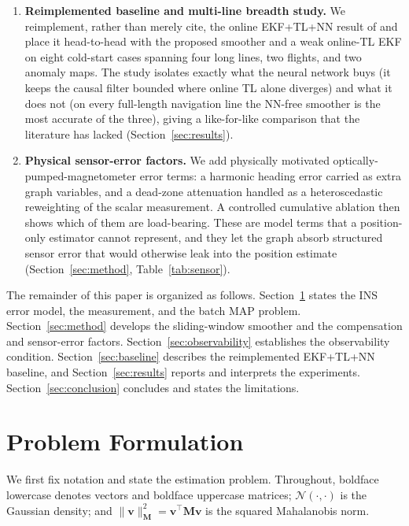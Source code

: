 \documentclass{IEEEtaes}
\begin{document}
\begin{enumerate}
        cannot see (Section~\ref{sec:observability}).
  \item \textbf{Reimplemented baseline and multi-line breadth study.} We
        reimplement, rather than merely cite, the online EKF+TL+NN result of
        \cite{hager2026} and place it head-to-head with the proposed smoother and a
        weak online-TL EKF on eight cold-start cases spanning four long lines, two
        flights, and two anomaly maps. The study isolates exactly what the neural
        network buys (it keeps the causal filter bounded where online TL alone
        diverges) and what it does not (on every full-length navigation line the
        NN-free smoother is the most accurate of the three), giving a like-for-like
        comparison that the literature has lacked (Section~\ref{sec:results}).
  \item \textbf{Physical sensor-error factors.} We add physically motivated
        optically-pumped-magnetometer error terms: a harmonic heading error carried
        as extra graph variables, and a dead-zone attenuation handled as a
        heteroscedastic reweighting of the scalar measurement. A controlled
        cumulative ablation then shows which of them are load-bearing. These are
        model terms that a position-only estimator cannot represent, and they let
        the graph absorb structured sensor error that would otherwise leak into the
        position estimate (Section~\ref{sec:method}, Table~\ref{tab:sensor}).
\end{enumerate}

The remainder of this paper is organized as follows.
Section~\ref{sec:background} states the INS error model, the measurement, and the
batch MAP problem. Section~\ref{sec:method} develops the sliding-window smoother
and the compensation and sensor-error factors. Section~\ref{sec:observability}
establishes the observability condition. Section~\ref{sec:baseline} describes the
reimplemented EKF+TL+NN baseline, and Section~\ref{sec:results} reports and
interprets the experiments. Section~\ref{sec:conclusion} concludes and states the
limitations.

\section{Problem Formulation}\label{sec:background}
We first fix notation and state the estimation problem. Throughout, boldface
lowercase denotes vectors and boldface uppercase matrices; $\mathcal{N}(\cdot,\cdot)$
is the Gaussian density; and $\lVert\mathbf{v}\rVert^2_{\mathbf{M}}=
\mathbf{v}^{\top}\mathbf{M}\mathbf{v}$ is the squared Mahalanobis norm.
\end{document}

